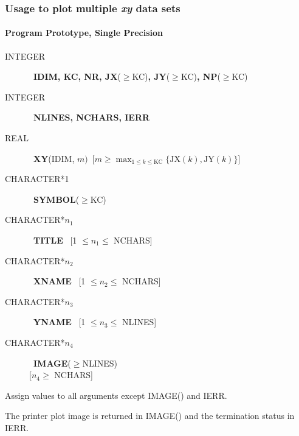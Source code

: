 \documentclass[twoside]{MATH77}
\begin{document}
\subsubsection{Usage to plot multiple {\em xy} data sets}

\paragraph{Program Prototype, Single Precision}

\begin{description}

\item[INTEGER] \ {\bf IDIM, KC, NR, JX}($\geq $KC){\bf , JY}($\geq $KC){\bf,
NP}($\geq $KC)

\item[INTEGER] \ {\bf NLINES, NCHARS, IERR}

\item[REAL] \ {\bf XY}(IDIM, $m)$\ ${\displaystyle [m \geq \max_{1 \leq k \leq
\text{KC}} \{\text{JX}(k), \text{JY}(k)\}}$]

\item[CHARACTER*1] \ {\bf SYMBOL}($\geq $KC)

\item[CHARACTER*$n_1$] \ {\bf TITLE} \ [1 $\leq n_1 \leq $ NCHARS]

\item[CHARACTER*$n_2$] \ {\bf XNAME} \ [1 $\leq n_2 \leq $ NCHARS]

\item[CHARACTER*$n_3$] \ {\bf YNAME} \ [1 $\leq n_3 \leq $ NLINES]

\item[CHARACTER*$n_4$] \ {\bf IMAGE}($\geq $NLINES)\\
$[n_4 \geq $ NCHARS]

\end{description}

Assign values to all arguments except IMAGE() and IERR.

\begin{center}
\end{center}

The printer plot image is returned in IMAGE() and the termination status in
IERR.
\end{document}

